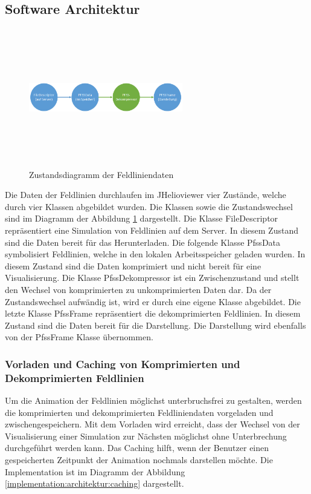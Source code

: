 \subsection{Software Architektur}
\begin{figure}[!htbp]
	\center
	\includegraphics[width=0.6\textwidth,height=6cm,keepaspectratio]{./pictures/implementation/dataflow.png}
	\caption{Zustandsdiagramm der Feldliniendaten}
	\label{implementation:architektur:datenfluss}
\end{figure}
Die Daten der Feldlinien durchlaufen im JHelioviewer vier Zustände, welche durch vier Klassen abgebildet wurden. Die Klassen sowie die Zustandswechsel sind im Diagramm der Abbildung \ref{implementation:architektur:datenfluss} dargestellt. Die Klasse FileDescriptor repräsentiert eine Simulation von Feldlinien auf dem Server. In diesem Zustand sind die Daten bereit für das Herunterladen. Die folgende Klasse PfssData symbolisiert Feldlinien, welche in den lokalen Arbeitsspeicher geladen wurden. In diesem Zustand sind die Daten komprimiert und nicht bereit für eine Visualisierung. Die Klasse PfssDekompressor ist ein Zwischenzustand und stellt den Wechsel von komprimierten zu unkomprimierten Daten dar. Da der Zustandswechsel aufwändig ist, wird er durch eine eigene Klasse abgebildet. Die letzte Klasse PfssFrame repräsentiert die dekomprimierten Feldlinien. In diesem Zustand sind die Daten bereit für die Darstellung. Die Darstellung wird ebenfalls von der PfssFrame Klasse übernommen.

\subsubsection{Vorladen und Caching von Komprimierten und Dekomprimierten Feldlinien}
Um die Animation der Feldlinien möglichst unterbruchsfrei zu gestalten, werden die komprimierten und dekomprimierten Feldliniendaten vorgeladen und zwischengespeichern. Mit dem Vorladen wird erreicht, dass der Wechsel von der Visualisierung einer Simulation zur Nächsten möglichst ohne Unterbrechung durchgeführt werden kann. Das Caching hilft, wenn der Benutzer einen gespeicherten Zeitpunkt der Animation nochmals darstellen möchte. Die Implementation ist im Diagramm der Abbildung \ref{implementation:architektur:caching} dargestellt.


